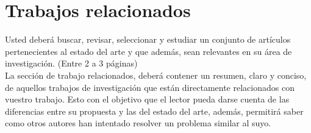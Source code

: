 \chapter{Trabajos relacionados}

Usted deberá buscar, revisar, seleccionar y estudiar un conjunto de artículos  pertenecientes  al  estado del arte  y  que además, sean relevantes en su área de investigación. (Entre 2 a 3 páginas)\\


La sección de trabajo relacionados, deberá contener un resumen, claro y conciso, de aquellos trabajos de investigación que están directamente relacionados con vuestro trabajo. Esto con el objetivo que el lector pueda darse cuenta de las diferencias entre su propuesta y las del estado del arte, además, permitirá saber como otros autores han intentado resolver un problema similar al suyo.

